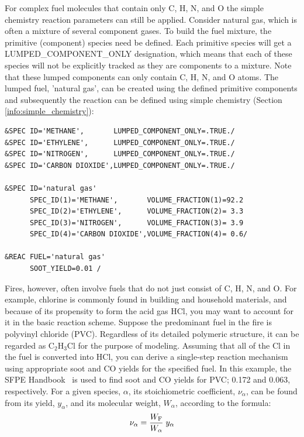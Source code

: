 \documentclass[11pt]{book}
\begin{document}
\label{info:Complex_Fuel}

For complex fuel molecules that contain only C, H, N, and O the simple chemistry reaction parameters can still be applied. Consider natural gas, which is often a mixture of several component gases. To build the fuel mixture, the primitive (component) species need be defined. Each primitive species will get a {\ct LUMPED\_COMPONENT\_ONLY} designation, which means that each of these species will not be explicitly tracked as they are components to a mixture.  Note that these lumped components can only contain C, H, N, and O atoms. The lumped fuel, {\ct 'natural gas'}, can be created using the defined primitive components and subsequently the reaction can be defined using simple chemistry (Section \ref{info:simple_chemistry}):
\begin{lstlisting}
&SPEC ID='METHANE',       LUMPED_COMPONENT_ONLY=.TRUE./
&SPEC ID='ETHYLENE',      LUMPED_COMPONENT_ONLY=.TRUE./
&SPEC ID='NITROGEN',      LUMPED_COMPONENT_ONLY=.TRUE./
&SPEC ID='CARBON DIOXIDE',LUMPED_COMPONENT_ONLY=.TRUE./

&SPEC ID='natural gas'
      SPEC_ID(1)='METHANE',       VOLUME_FRACTION(1)=92.2
      SPEC_ID(2)='ETHYLENE',      VOLUME_FRACTION(2)= 3.3
      SPEC_ID(3)='NITROGEN',      VOLUME_FRACTION(3)= 3.9
      SPEC_ID(4)='CARBON DIOXIDE',VOLUME_FRACTION(4)= 0.6/

&REAC FUEL='natural gas'
      SOOT_YIELD=0.01 /
\end{lstlisting}
Fires, however, often involve fuels that do not just consist of C, H, N, and O. For example, chlorine is commonly found in building and household materials, and because
of its propensity to form the acid gas HCl, you may want to account for it in the basic reaction scheme. Suppose the predominant fuel in the fire is polyvinyl chloride (PVC). Regardless of its detailed polymeric structure, it can be regarded as C$_2$H$_3$Cl for the purpose of modeling. Assuming that all of the Cl in the fuel is converted into HCl, you can derive a single-step reaction mechanism using appropriate soot and CO yields for the specified fuel. In this example, the SFPE Handbook~\cite{SFPE:Tewarson} is used to find soot and CO yields for PVC; 0.172 and 0.063, respectively. For a given species, $\alpha$, its stoichiometric coefficient, $\nu_\alpha$, can be found from its yield, $y_\alpha$, and its molecular weight, $W_\alpha$, according to the formula:
\begin{equation}\label{eq:stoic_yield}
\nu_\alpha = \frac{W_{\rm F}}{W_\alpha} \; y_\alpha
\end{equation}
\end{document}
